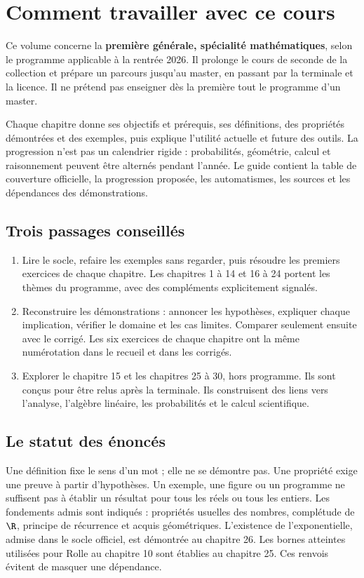 
\chapter*{Comment travailler avec ce cours}
Ce volume concerne la \textbf{première générale, spécialité mathématiques},
selon le programme applicable à la rentrée 2026. Il prolonge le cours de seconde
de la collection et prépare un parcours jusqu'au master, en passant par la
terminale et la licence. Il ne prétend pas enseigner dès la première tout le
programme d'un master.

Chaque chapitre donne ses objectifs et prérequis, ses définitions, des propriétés
démontrées et des exemples, puis explique l'utilité actuelle et future des outils.
La progression n'est pas un calendrier rigide : probabilités, géométrie, calcul
et raisonnement peuvent être alternés pendant l'année.
Le guide contient la table de couverture officielle, la progression proposée,
les automatismes, les sources et les dépendances des démonstrations.

\section*{Trois passages conseillés}
\begin{enumerate}
\item Lire le socle, refaire les exemples sans regarder, puis résoudre les premiers
exercices de chaque chapitre. Les chapitres 1 à 14 et 16 à 24 portent les thèmes
du programme, avec des compléments explicitement signalés.
\item Reconstruire les démonstrations : annoncer les hypothèses, expliquer chaque
implication, vérifier le domaine et les cas limites. Comparer seulement ensuite
avec le corrigé. Les six exercices de chaque chapitre ont la même numérotation
dans le recueil et dans les corrigés.
\item Explorer le chapitre 15 et les chapitres 25 à 30, hors programme.
Ils sont conçus pour être relus après la terminale. Ils construisent des liens
vers l'analyse, l'algèbre linéaire, les probabilités et le calcul scientifique.
\end{enumerate}

\section*{Le statut des énoncés}
Une définition fixe le sens d'un mot ; elle ne se démontre pas.
Une propriété exige une preuve à partir d'hypothèses.
Un exemple, une figure ou un programme ne suffisent pas à établir un résultat
pour tous les réels ou tous les entiers.
Les fondements admis sont indiqués : propriétés usuelles des nombres,
complétude de $\R$, principe de récurrence et acquis géométriques.
L'existence de l'exponentielle, admise dans le socle officiel, est démontrée
au chapitre 26. Les bornes atteintes utilisées pour Rolle au chapitre 10
sont établies au chapitre 25. Ces renvois évitent de masquer une dépendance.

